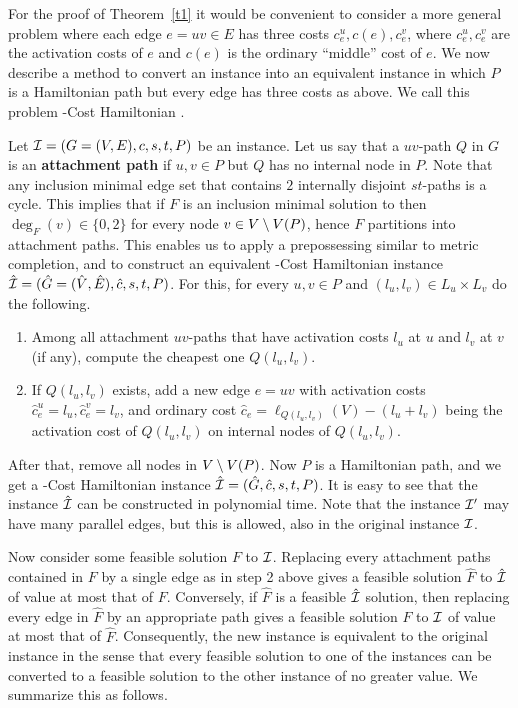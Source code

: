 \documentclass[a4paper,UKenglish,autoref]{lipics-v2019}
\begin{document}
For the proof of Theorem~\ref{t1} it would be convenient to consider a more general problem 
where each edge $e=uv \in E$ has three costs $c_e^u,c(e),c_e^v$, where 
$c_e^u,c_e^v$ are the activation costs of $e$ and $c(e)$ is the ordinary ``middle'' cost of $e$. 
We now describe a method to convert an {\atdpa} instance into an equivalent instance 
in which $P$ is a Hamiltonian path but every edge has three costs as above. 
We call this problem {-Cost Hamiltonian} {\atdpa}.

Let ${\cal I}=(G=(V,E),c,s,t,P)$ be an {\atdpa} instance. 
Let us say that a $uv$-path $Q$ in $G$ is an {\bf attachment path} if $u,v \in P$ but $Q$ has no internal node in $P$.
Note that any inclusion minimal edge set that contains $2$ internally disjoint $st$-paths is a cycle. 
This implies that if $F$ is an inclusion minimal solution to {\atdpa} then $\deg_F(v) \in \{0,2\}$ for every node $v \in V \setminus V(P)$,
hence $F$ partitions into attachment paths. 
This enables us to apply a prepossessing similar to metric completion, and to construct  
an equivalent {-Cost Hamiltonian} {\atdpa} instance $\hat {{\cal I}}=(\hat G=(\hat V,\hat E),\hat c, s,t,P)$.
For this, for every $u,v \in P$ and $(l_u,l_v) \in L_u \times L_v$ do the following.
\begin{enumerate}
\item
Among all attachment $uv$-paths that have activation costs $l_u$ at $u$ and $l_v$ at $v$ (if any), 
compute the cheapest one $Q(l_u,l_v)$.
\item
If $Q(l_u,l_v)$ exists, add a new edge $e=uv$ with activation costs $\hat c_e^u=l_u, \hat c_e^v=l_v$, 
and ordinary cost $\hat c_e= \ell_{Q(l_u,l_v)}(V)-(l_u+l_v)$ being the activation cost of $Q(l_u,l_v)$ on internal nodes of $Q(l_u,l_v)$.
\end{enumerate}
After that, remove all nodes in $V \setminus V(P)$. Now $P$ is a Hamiltonian path, and we get a 
{-Cost Hamiltonian} {\atdpa} instance $\hat {{\cal I}}=(\hat G,\hat c,s,t,P)$.
It is easy to see that the instance $\hat {{\cal I}}$ can be constructed in polynomial time. 
Note that the instance ${\cal I}'$ may have many parallel edges, but this is allowed, also in the original instance ${\cal I}$. 

Now consider some feasible solution $F$ to ${\cal I}$. 
Replacing every attachment paths contained in $F$ by a single edge as in step 2 above
gives a feasible solution $\hat F$ to $\hat {{\cal I}}$ of value at most that of $F$.  
Conversely, if $\hat F$ is a feasible $\hat {{\cal I}}$ solution, then replacing every edge in $\hat F$ 
by an appropriate path gives a feasible solution $F$ to ${\cal I}$ of value at most that of $\hat F$.  
Consequently, the new instance is equivalent to the original instance in the sense that 
every feasible solution to one of the instances can be converted to a feasible solution to the other instance of no greater value. 
We summarize this as follows.
\end{document}
